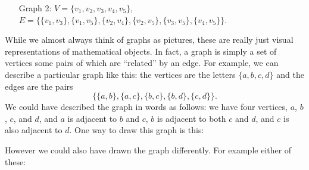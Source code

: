 \documentclass[12pt]{article}
\begin{document}
\begin{activity}
\begin{questions}
\begin{itemize}
\item[Graph 2:] $V = \{v_1, v_2, v_3, v_4, v_5\}$,\\ $E = \{\{v_1, v_3\}, \{v_1, v_5\}, \{v_2, v_4\}, \{v_2, v_5\}, \{v_3, v_5\}, \{v_4, v_5\}\}$.

\end{itemize}

\end{questions}

\end{activity}


While we almost always think of graphs as pictures, these are really just visual representations of mathematical objects.  In fact, a graph is simply a set of vertices some pairs of which are ``related'' by an edge.  For example, we can describe a particular graph like this: the vertices are the letters $\{a,b,c,d\}$ and the edges are the pairs \[\{\{a,b\}, \{a,c\}, \{b,c\}, \{b,d\}, \{c,d\}\}.\]  %
We could have described the graph in words as follows: we have four vertices, $a$, $b$, $c$, and $d$, and $a$ is adjacent to $b$ and $c$, $b$ is adjacent to both $c$ and $d$, and $c$ is also adjacent to $d$.  One way to draw this graph is this:
\begin{center}
\end{center}

However we could also have drawn the graph differently.  For example either of these:

\begin{center}
  \hspace{1in}
\end{center}
\end{document}
